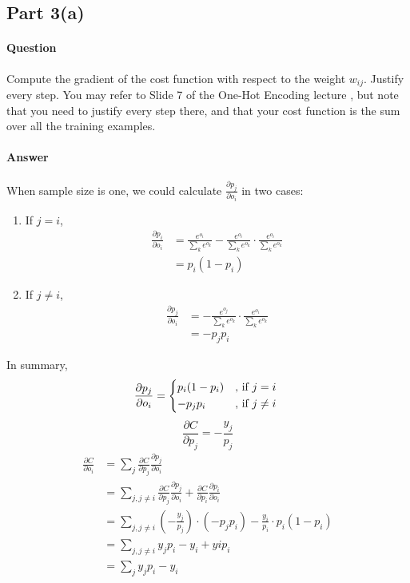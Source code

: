 \documentclass[11pt,twoside]{article}
\begin{document}
\subsection*{Part 3(a)}
\paragraph{Question}
Compute the gradient of the cost function with respect to the weight $w_{ij}$. Justify every step. You may refer to Slide 7 of the One-Hot Encoding lecture , but note that you need to justify every step there, and that your cost function is the sum over all the training examples.

\paragraph{Answer}
When sample size is one, we could calculate $\frac{\partial p_j}{\partial o_i}$ in two cases:
\begin{enumerate}
\item If $j = i$,
\begin{align*}
\frac{\partial p_i}{\partial o_i} &= \frac{e^{o_i}}{\sum_{k}e^{o_k}} - \frac{e^{o_i}}{\sum_{k}e^{o_k}} \cdot \frac{e^{o_i}}{\sum_{k}e^{o_k}}\\
&= p_i(1 - p_i)
\end{align*}
\item If $j \neq i$,
\begin{align*}
\frac{\partial p_j}{\partial o_i} &= -\frac{e^{o_j}}{\sum_{k}e^{o_k}} \cdot \frac{e^{o_i}}{\sum_{k}e^{o_k}}\\
&= -p_jp_i
\end{align*}
\end{enumerate}
In summary,
\begin{equation}
    \frac{\partial p_j}{\partial o_i} =
    \begin{cases*}
      p_i(1 - p_i) &, if $j = i$ \\
      -p_jp_i &, if $j \neq i$
    \end{cases*}
\end{equation}
\[\frac{\partial C}{\partial p_j} = -\frac{y_j}{p_j}\]
\begin{align*}
\frac{\partial C}{\partial o_{i}} &= \sum_{j}\frac{\partial C}{\partial p_j} \frac{\partial p_j}{\partial o_i}\\
&= \sum_{j, j \neq i}\frac{\partial C}{\partial p_j} \frac{\partial p_j}{\partial o_i} + \frac{\partial C}{\partial p_i} \frac{\partial p_i}{\partial o_i}\\
&= \sum_{j, j \neq i}(-\frac{y_j}{p_j}) \cdot (-p_jp_i) - \frac{y_i}{p_i} \cdot p_i(1 - p_i)\\
&= \sum_{j, j \neq i}y_jp_i - y_i + yip_i\\
&= \sum_{j}y_jp_i - y_i\\
\end{align*}
\end{document}
